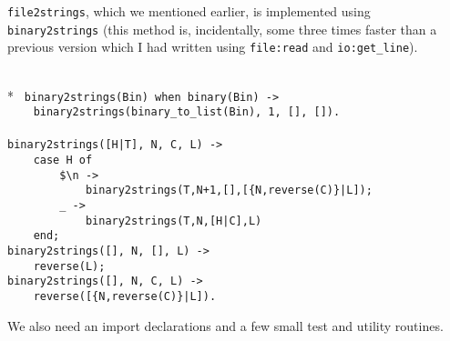 \verb+file2strings+, which we mentioned earlier, is implemented using\\
\verb+binary2strings+ (this method is, incidentally, some three times
faster than a previous version which I had written using
\verb+file:read+ and \verb+io:get_line+).

\begin{flushleft}
\label{utilities_3_8}
\\*
\tt
\noindent{}%
\verb&binary2strings(Bin) when binary(Bin) ->&\\
\noindent{}%
\verb&    binary2strings(binary_to_list(Bin), 1, [], []).&\\
\noindent{}%
\verb&&\\
\noindent{}%
\verb&binary2strings([H|T], N, C, L) ->&\\
\noindent{}%
\verb&    case H of&\\
\noindent{}%
\verb&        $\n -> &\\
\noindent{}%
\verb&            binary2strings(T,N+1,[],[{N,reverse(C)}|L]);&\\
\noindent{}%
\verb&        _ -> &\\
\noindent{}%
\verb&            binary2strings(T,N,[H|C],L)&\\
\noindent{}%
\verb&    end;&\\
\noindent{}%
\verb&binary2strings([], N, [], L) ->&\\
\noindent{}%
\verb&    reverse(L);&\\
\noindent{}%
\verb&binary2strings([], N, C, L) ->&\\
\noindent{}%
\verb&    reverse([{N,reverse(C)}|L]).&\\
\end{flushleft}

  We also need an import declarations and a  few small test and
utility routines.



